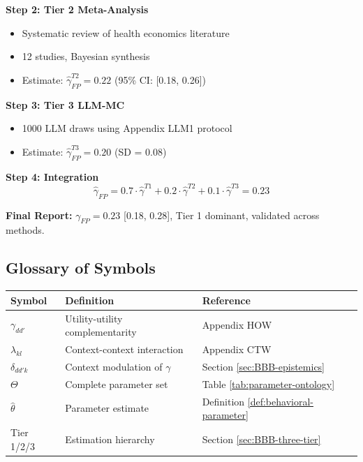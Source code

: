 \textbf{Step 2: Tier 2 Meta-Analysis}
\begin{itemize}[nosep]
    \item Systematic review of health economics literature
    \item 12 studies, Bayesian synthesis
    \item Estimate: $\hat{\gamma}_{FP}^{T2} = 0.22$ (95\% CI: [0.18, 0.26])
\end{itemize}

\textbf{Step 3: Tier 3 LLM-MC}
\begin{itemize}[nosep]
    \item 1000 LLM draws using Appendix LLM1 protocol
    \item Estimate: $\hat{\gamma}_{FP}^{T3} = 0.20$ (SD = 0.08)
\end{itemize}

\textbf{Step 4: Integration}
\begin{equation}
\hat{\gamma}_{FP} = 0.7 \cdot \hat{\gamma}^{T1} + 0.2 \cdot \hat{\gamma}^{T2} + 0.1 \cdot \hat{\gamma}^{T3} = 0.23
\end{equation}

\textbf{Final Report:}
$\gamma_{FP} = 0.23$ [0.18, 0.28], Tier 1 dominant, validated across methods.


\subsection{Glossary of Symbols}
\label{sec:BBB-glossary}

\begin{center}
\renewcommand{\arraystretch}{1.3}
\begin{tabular}{@{}lll@{}}
\toprule
\textbf{Symbol} & \textbf{Definition} & \textbf{Reference} \\
\midrule
$\gamma_{dd'}$ & Utility-utility complementarity & Appendix HOW \\
$\lambda_{kl}$ & Context-context interaction & Appendix CTW \\
$\delta_{dd'k}$ & Context modulation of $\gamma$ & Section \ref{sec:BBB-epistemics} \\
$\Theta$ & Complete parameter set & Table \ref{tab:parameter-ontology} \\
$\hat{\theta}$ & Parameter estimate & Definition \ref{def:behavioral-parameter} \\
Tier 1/2/3 & Estimation hierarchy & Section \ref{sec:BBB-three-tier} \\
\bottomrule
\end{tabular}
\end{center}

